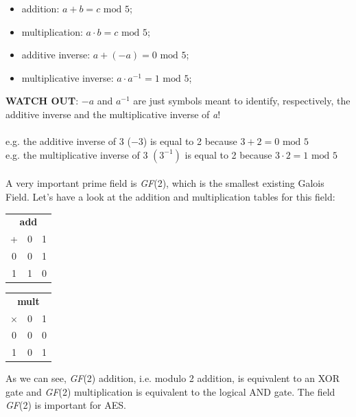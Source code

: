 \documentclass[11pt, a4paper]{article}
\newcommand{\gf}[1]{\textit{GF}(#1)}
\newcommand{\mymod}{
    \text{ mod }
}
\begin{document}
\begin{itemize}
    \item addition: $a+b=c\mymod5$;
    \item multiplication: $a\cdot b=c\mymod5$;
    \item additive inverse: $a+(-a)=0\mymod5$;
    \item multiplicative inverse: $a\cdot a^{-1}=1\mymod5$;
\end{itemize}
\textbf{WATCH OUT}: $-a$ and $a^{-1}$ are just symbols meant to identify, respectively, the additive inverse and the multiplicative inverse of \textit{a}!\\\\
e.g. the additive inverse of 3 ($-3$) is equal to 2 because $3+2=0\mymod5$\\
e.g. the multiplicative inverse of 3 $\left(3^{-1}\right)$ is equal to 2 because $3\cdot2=1\mymod5$\\\\
A very important prime field is \gf{2}, which is the smallest existing Galois Field. Let's have a look at the addition and multiplication tables for this field:
\begin{center}
    \begin{tabular}{c|cc}
         \multicolumn{3}{c}{\textbf{add}}\\
         +&0&1\\
         \hline
         0&0&1\\
         1&1&0
    \end{tabular}\qquad
    \begin{tabular}{c|cc}
         \multicolumn{3}{c}{\textbf{mult}}\\
         $\times$&0&1\\
         \hline
         0&0&0\\
         1&0&1
    \end{tabular}
\end{center}
As we can see, \gf{2} addition, i.e. modulo 2 addition, is equivalent to an XOR gate and \gf{2} multiplication is equivalent to the logical AND gate. The field \gf{2} is important for AES.

\newpage
\end{document}
